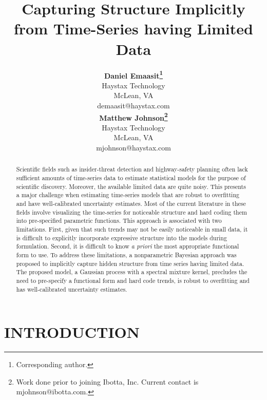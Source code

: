 \documentclass[letterpaper]{article}
\title{Capturing Structure Implicitly from Time-Series having Limited Data}
\author{} %
\author{ {\bf Daniel Emaasit\thanks{Corresponding author.}} \\
Haystax Technology \\
McLean, VA    \\
demaasit@haystax.com\\
\And
{\bf Matthew Johnson\thanks{Work done prior to joining Ibotta, Inc. Current contact is mjohnson@ibotta.com.}}   \\
Haystax Technology \\
McLean, VA    \\
mjohnson@haystax.com\\
}
\begin{document}
\maketitle

\begin{abstract}
Scientific fields such as insider-threat detection and highway-safety planning often lack sufficient amounts of time-series data to estimate statistical models for the purpose of scientific discovery. Moreover, the available limited data are quite noisy. This presents a major challenge when estimating time-series models that are robust to overfitting and have well-calibrated uncertainty estimates. Most of the current literature in these fields involve visualizing the time-series for noticeable structure and hard coding them into pre-specified parametric functions. This approach is associated with two limitations. First, given that such trends may not be easily noticeable in small data, it is difficult to explicitly incorporate expressive structure into the models during formulation.  Second, it is difficult to know \textit{a priori} the most appropriate functional form to use. To address these limitations, a nonparametric Bayesian approach was proposed to implicitly capture hidden structure from time series having limited data. The proposed model, a Gaussian process with a spectral mixture kernel, precludes the need to pre-specify a functional form and hard code trends, is robust to overfitting and has well-calibrated uncertainty estimates.
\end{abstract}

\section{INTRODUCTION}
\end{document}
